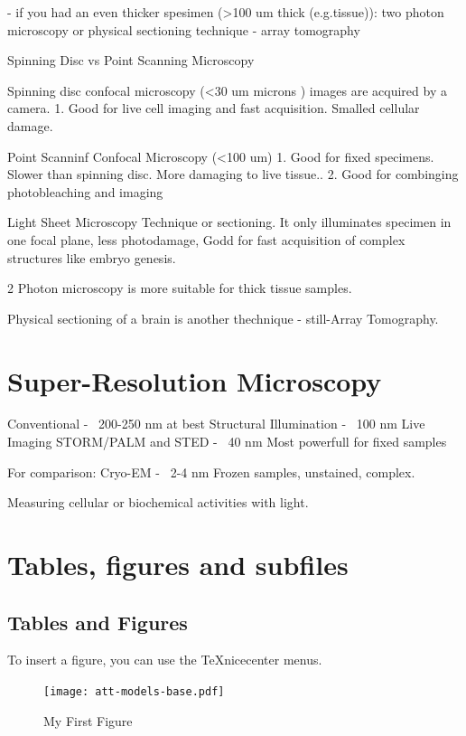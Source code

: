 \documentclass[twocolumn]{article}
\begin{document}
- if you had an even thicker spesimen (>100 um thick (e.g.tissue)):
two photon microscopy or physical sectioning technique - array tomography

Spinning Disc vs Point Scanning Microscopy 

Spinning disc confocal microscopy (<30 um microns ) images are acquired by a camera. 
1. Good for live cell imaging and fast acquisition. 
Smalled cellular damage.

Point Scanninf Confocal Microscopy (<100 um)
1. Good for fixed specimens.
Slower than spinning disc.
More damaging to live tissue..
2. Good for combinging photobleaching and imaging

Light Sheet Microscopy Technique or sectioning. 
It only illuminates specimen in one focal plane, less photodamage, 
Godd for fast acquisition of complex structures like embryo genesis.


2 Photon microscopy is more suitable for thick tissue samples. 

Physical sectioning of a brain is another thechnique - still-Array Tomography.

\section{Super-Resolution Microscopy}\label{sec:superres}

Conventional - ~200-250 nm at best
Structural Illumination - ~100 nm Live Imaging
STORM/PALM and STED - ~40 nm Most powerfull for fixed samples

For comparison:
Cryo-EM - ~2-4 nm Frozen samples, unstained, complex. 

Measuring cellular or biochemical activities with light.



\section{Tables, figures and subfiles}\label{sec:background}

\subsection{Tables and Figures}

To insert a figure, you can use the TeXnicecenter menus. 
\begin{figure}
	\centering
		\texttt{[image: att-models-base.pdf]}
	\caption{My First Figure}
	\label{fig:att-models-base}
\end{figure}
\end{document}
